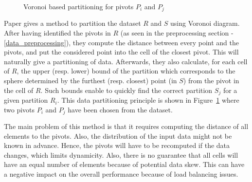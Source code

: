 \begin{figure}[t]
\centering
{}
\caption{Voronoi based partitioning for pivots $P_i$ and $P_j$ \label{voronoi_partition_figure}}
\end{figure}

Paper \cite{Lu:2012:EPK:2336664.2336674} gives a method to partition the dataset $R$ and $S$ using Voronoi diagram. 
After having identified the pivots in $R$ (as seen in the preprocessing section - \ref{data_preprocessing}), they compute the distance between every point and 
the pivots, and put the considered point into the cell of the closest pivot. This will  naturally give a partitioning of data. Afterwards, they also 
calculate, for each cell of $R$,
the upper (resp. lower) bound of the partition which corresponds to the sphere determined by the furthest (resp. closest) point (in $S$) from the pivot in 
the cell of $R$. Such bounds enable to quickly find the correct partition $S_j$ for a given partition $R_i$.
This data partitioning principle is shown in Figure~\ref{voronoi_partition_figure} where two pivots $P_i$ and $P_j$ have been chosen from the dataset.

The main problem of this method is that it requires computing the distance of all elements to the pivots. Also, the distribution of the input data might 
not be known in advance. Hence, the pivots will have to be recomputed if the data changes, which limits dynamicity. Also, there is no 
guarantee that all cells will have an equal number of elements because of potential data skew. This can have a negative impact on the overall performance
because of load balancing issues.  


